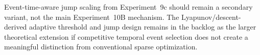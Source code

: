 Event-time-aware jump scaling from Experiment~9c should remain a secondary variant, not the main Experiment~10B mechanism. The Lyapunov/descent-derived adaptive threshold and jump design remains in the backlog as the larger theoretical extension if competitive temporal event selection does not create a meaningful distinction from conventional sparse optimization.
